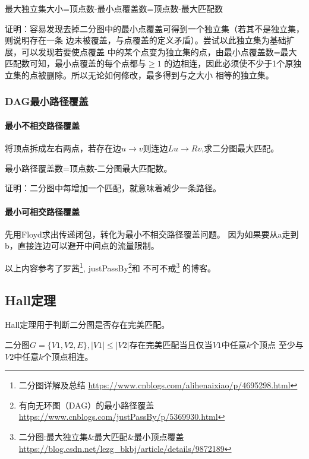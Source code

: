 \begin{theorem}
	最大独立集大小=顶点数-最小点覆盖数=顶点数-最大匹配数
\end{theorem}

证明：容易发现去掉二分图中的最小点覆盖可得到一个独立集（若其不是独立集，则说明存在一条
边未被覆盖，与点覆盖的定义矛盾）。尝试以此独立集为基础扩展，可以发现若要使点覆盖
中的某个点变为独立集的点，由最小点覆盖数=最大匹配数可知，最小点覆盖的每个点都与$\geq 1$
的边相连，因此必须使不少于1个原独立集的点被删除。所以无论如何修改，最多得到与之大小
相等的独立集。

\subsubsection{DAG最小路径覆盖}

\paragraph{最小不相交路径覆盖}

将顶点拆成左右两点，若存在边$u\rightarrow v$则连边$Lu\rightarrow Rv$,求二分图最大匹配。

\begin{theorem}
	最小路径覆盖数=顶点数-二分图最大匹配数。
\end{theorem}

证明：二分图中每增加一个匹配，就意味着减少一条路径。

\paragraph{最小可相交路径覆盖}

先用Floyd求出传递闭包，转化为最小不相交路径覆盖问题。
因为如果要从a走到b，直接连边可以避开中间点的流量限制。

以上内容参考了罗茜\footnote{二分图详解及总结
	\url{https://www.cnblogs.com/alihenaixiao/p/4695298.html}},
justPassBy\footnote{有向无环图（DAG）的最小路径覆盖
	\url{https://www.cnblogs.com/justPassBy/p/5369930.html}}和
不可不戒\footnote{二分图:最大独立集\&最大匹配\&最小顶点覆盖
	\url{https://blog.csdn.net/lezg\_bkbj/article/details/9872189}}
的博客。
\subsection{Hall定理}
Hall定理用于判断二分图是否存在完美匹配。
\begin{theorem}\label{Hall}
    二分图$G=\{V1,V2,E\},|V1|\leq|V2|$存在完美匹配当且仅当$V1$中任意$k$个顶点
    至少与$V2$中任意$k$个顶点相连。
\end{theorem}

